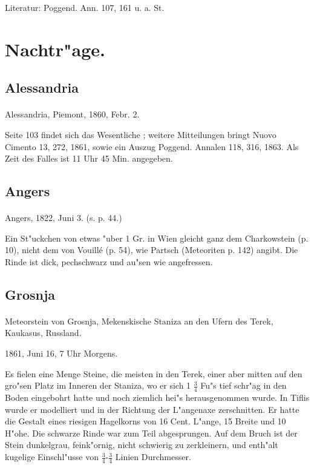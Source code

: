 \documentclass[a4paper, 11pt, oneside]{article}
\begin{document}
Literatur: Poggend. Ann. 107, 161 u. a. St.

\section{Nachtr"age.}

\subsection{Alessandria}
\normalsize
\paragraph{}
Alessandria, Piemont, 1860, Febr. 2.

Seite 103 findet sich das Wesentliche ; weitere Mitteilungen bringt Nuovo Cimento 13, 272, 1861, sowie ein Auszug Poggend. Annalen 118, 316, 1863. Als Zeit des Falles ist 11 Uhr 45 Min. angegeben.

\subsection{Angers}
\paragraph{}
Angers, 1822, Juni 3. (s. p. 44.)

Ein St"uckchen von etwas "uber 1 Gr. in Wien gleicht ganz dem Charkowstein (p. 10), nicht dem von Vouillé (p. 54), wie Partsch (Meteoriten p. 142) angibt. Die Rinde ist dick, pechschwarz und au"sen wie angefressen.

\subsection{Grosnja}
\paragraph{}
Meteorstein von Grosnja, Mekenskische Staniza an den Ufern des Terek, Kaukasus, Russland.

1861, Juni 16, 7 Uhr Morgens.

Es fielen eine Menge Steine, die meisten in den Terek, einer aber mitten auf den gro"sen Platz im Inneren der Staniza, wo er sich 1 $\frac{3}{4}$ Fu"s tief schr"ag in den Boden eingebohrt hatte und noch ziemlich hei"s herausgenommen wurde. In Tiflis wurde er modelliert und in der Richtung der L"angenaxe zerschnitten. Er hatte die Gestalt eines riesigen Hagelkorns von 16 Cent. L"ange, 15 Breite und 10 H"ohe. Die schwarze Rinde war zum Teil abgesprungen. Auf dem Bruch ist der Stein dunkelgrau, feink"ornig, nicht schwierig zu zerkleinern, und enth"alt kugelige Einschl"usse von $\frac{3}{4}$-$\frac{3}{4}$ Linien Durchmesser.
\end{document}
